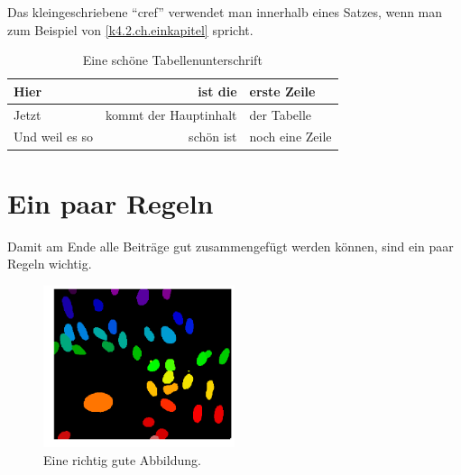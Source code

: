 \documentclass{dsadokumentation}
\begin{document}
Das kleingeschriebene \enquote{cref} verwendet man innerhalb eines Satzes, wenn man zum Beispiel von \cref{k4.2.ch.einkapitel} spricht.

\begin{table}
	\centering
	\begin{tabular}{lrl}
		\toprule
		Hier           & ist die               & erste Zeile     \\\midrule
		Jetzt          & kommt der Hauptinhalt & der Tabelle     \\
		Und weil es so & schön ist             & noch eine Zeile \\
		\bottomrule
	\end{tabular}
	\caption{Eine schöne Tabellenunterschrift}
	\label{k4.2.tab.bestetabelle}
\end{table}

\section{Ein paar Regeln}
Damit am Ende alle Beiträge gut zusammengefügt werden können, sind ein paar Regeln wichtig.

\begin{figure}
	\centering
	\includegraphics[width=0.5\textwidth]{k4.2/exampleimage.png}
	\caption{Eine richtig gute Abbildung.}
	\label{k4.2.fig.meinefigure}
\end{figure}
\end{document}
